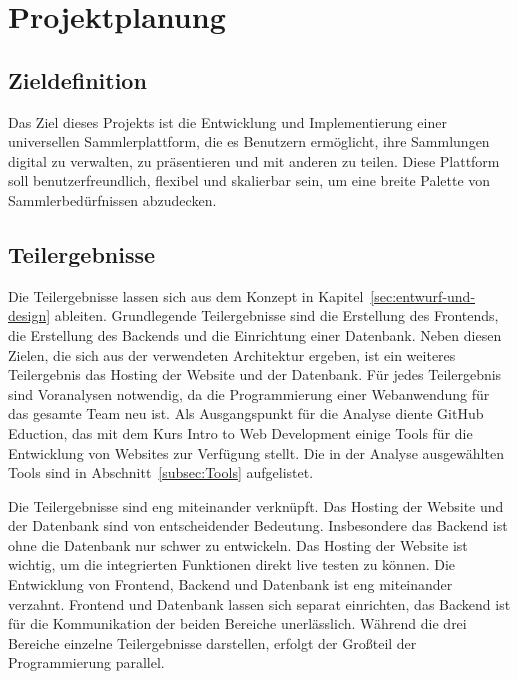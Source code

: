 \section{Projektplanung}\label{sec:projektplanung}

\subsection{Zieldefinition}\label{subsec:zieldefinition}
Das Ziel dieses Projekts ist die Entwicklung und Implementierung einer universellen Sammlerplattform, die es Benutzern ermöglicht, ihre Sammlungen digital zu verwalten, zu präsentieren und mit anderen zu teilen.
Diese Plattform soll benutzerfreundlich, flexibel und skalierbar sein, um eine breite Palette von Sammlerbedürfnissen abzudecken.

\subsection{Teilergebnisse}\label{subsec:teilergebnisses}
Die Teilergebnisse lassen sich aus dem Konzept in Kapitel~\ref{sec:entwurf-und-design} ableiten.
Grundlegende Teilergebnisse sind die Erstellung des Frontends, die Erstellung des Backends und die Einrichtung einer Datenbank.
Neben diesen Zielen, die sich aus der verwendeten Architektur ergeben, ist ein weiteres Teilergebnis das Hosting der Website und der Datenbank.
Für jedes Teilergebnis sind Voranalysen notwendig, da die Programmierung einer Webanwendung für das gesamte Team neu ist.
Als Ausgangspunkt für die Analyse diente GitHub Eduction, das mit dem Kurs Intro to Web Development einige Tools für die Entwicklung von Websites zur Verfügung stellt.
Die in der Analyse ausgewählten Tools sind in Abschnitt~\ref{subsec:Tools} aufgelistet.

Die Teilergebnisse sind eng miteinander verknüpft.
Das Hosting der Website und der Datenbank sind von entscheidender Bedeutung.
Insbesondere das Backend ist ohne die Datenbank nur schwer zu entwickeln.
Das Hosting der Website ist wichtig, um die integrierten Funktionen direkt live testen zu können.
Die Entwicklung von Frontend, Backend und Datenbank ist eng miteinander verzahnt.
Frontend und Datenbank lassen sich separat einrichten, das Backend ist für die Kommunikation der beiden Bereiche unerlässlich.
Während die drei Bereiche einzelne Teilergebnisse darstellen, erfolgt der Großteil der Programmierung parallel.

